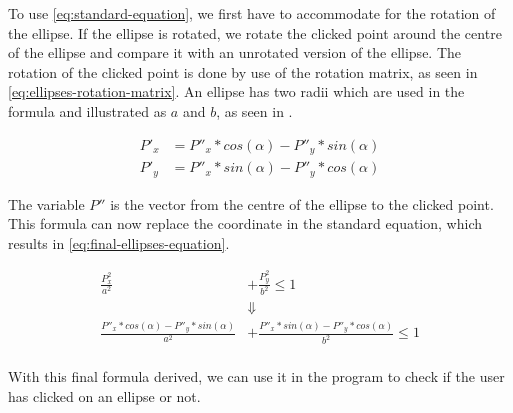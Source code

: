 To use \eqref{eq:standard-equation}, we first have to accommodate for the rotation of the ellipse.
If the ellipse is rotated, we rotate the clicked point around the centre of the ellipse and compare it with an unrotated version of the ellipse.
The rotation of the clicked point is done by use of the rotation matrix, as seen in \eqref{eq:ellipses-rotation-matrix}.
An ellipse has two radii which are used in the formula and illustrated as $a$ and $b$, as seen in .

\begin{equation}\label{eq:ellipses-rotation-matrix}
\begin{aligned}
	P'_x &= P''_x * cos(\alpha) - P''_y * sin(\alpha)\\
	P'_y &= P''_x * sin(\alpha) - P''_y * cos(\alpha)
\end{aligned}
\end{equation}

The variable $P''$ is the vector from the centre of the ellipse to the clicked point.
This formula can now replace the coordinate in the standard equation, which results in \eqref{eq:final-ellipses-equation}.


\begin{equation}\label{eq:final-ellipses-equation}
\begin{aligned}
	\frac{P_x^2}{a^2} &+ \frac{P_y^2}{b^2} \leq 1	\\
	&\Downarrow\\
	\frac{ P''_x * cos(\alpha) - P''_y * sin(\alpha)}{a^2} &+ \frac{P''_x * sin(\alpha) - P''_y * cos(\alpha)}{b^2} \leq 1\\
\end{aligned}
\end{equation}

With this final formula derived, we can use it in the program to check if the user has clicked on an ellipse or not.

